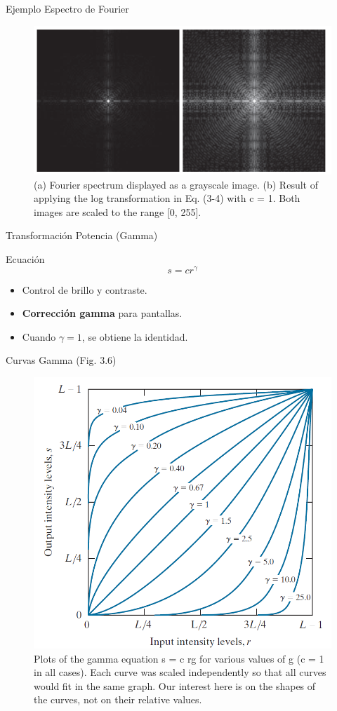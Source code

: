 \documentclass{beamer}
\begin{document}
\begin{frame}{Ejemplo Espectro de Fourier}
\begin{figure}
\includegraphics[width=0.8\linewidth]{figuras/Fig_3_5.png}
\caption{(a) Fourier spectrum displayed as a grayscale image. (b) Result of applying the log transformation in Eq. (3-4) with c = 1. Both images are scaled to the range [0, 255].}
\end{figure}
\end{frame}

\begin{frame}{Transformaci\'on Potencia (Gamma)}
\begin{block}{Ecuaci\'on}
\[
s = c r^\gamma \tag{3-5}
\]
\end{block}
\begin{itemize}
    \item Control de brillo y contraste.
    \item \textbf{Correcci\'on gamma} para pantallas.
    \item Cuando \( \gamma = 1 \), se obtiene la identidad.
\end{itemize}
\end{frame}

\begin{frame}{Curvas Gamma (Fig. 3.6)}
\centering
\begin{figure}
\includegraphics[width=0.5\linewidth]{figuras/Fig_3_6.png}
\caption{\footnotesize{Plots of the gamma equation
s = c rg for various
values of g (c = 1
in all cases). Each
curve was scaled
independently so
that all curves
would fit in the
same graph. Our
interest here is
on the shapes of
the curves, not
on their relative
values.}}
\end{figure}
\end{frame}
\end{document}
